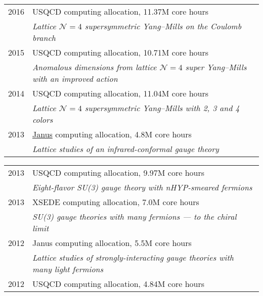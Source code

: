 \begin{spacelist}
\begin{tabular}[t]{cl}
      2016 & USQCD computing allocation, 11.37M core hours                                                            \\ %
           & \textit{Lattice $\mathcal N = 4$ supersymmetric Yang--Mills on the Coulomb branch}                       \\[6 pt]
      2015 & USQCD computing allocation, 10.71M core hours                                                            \\ %
           & \textit{Anomalous dimensions from lattice $\mathcal N = 4$ super Yang--Mills with an improved action}    \\[6 pt]
      2014 & USQCD computing allocation, 11.04M core hours                                                            \\ %
           & \textit{Lattice $\mathcal N = 4$ supersymmetric Yang--Mills with 2, 3 and 4 colors}                      \\[6 pt]
      2013 & \href{https://www.top500.org/system/176922}{Janus} computing allocation, 4.8M core hours                 \\ %
           & \textit{Lattice studies of an infrared-conformal gauge theory}                                           \\[6 pt]
    \end{tabular} %
    \begin{tabular}[t]{cl}
      2013 & USQCD computing allocation, 9.97M core hours                                                             \\ %
           & \textit{Eight-flavor SU(3) gauge theory with nHYP-smeared fermions}                                      \\[6 pt]
      2013 & XSEDE computing allocation, 7.0M core hours                                                              \\ %
           & \textit{SU(3) gauge theories with many fermions --- to the chiral limit}                                 \\[6 pt]
      2012 & Janus computing allocation, 5.5M core hours                                                              \\ %
           & \textit{Lattice studies of strongly-interacting gauge theories with many light fermions}                 \\[6 pt]
      2012 & USQCD computing allocation, 4.84M core hours                                                             \\ %

\end{tabular}
\end{spacelist}
